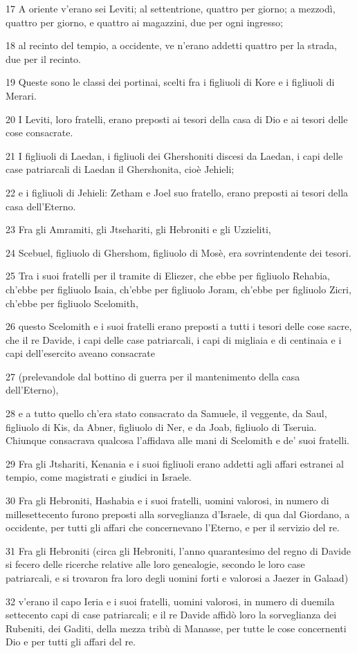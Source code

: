 \par 17 A oriente v'erano sei Leviti; al settentrione, quattro per giorno; a mezzodì, quattro per giorno, e quattro ai magazzini, due per ogni ingresso;
\par 18 al recinto del tempio, a occidente, ve n'erano addetti quattro per la strada, due per il recinto.
\par 19 Queste sono le classi dei portinai, scelti fra i figliuoli di Kore e i figliuoli di Merari.
\par 20 I Leviti, loro fratelli, erano preposti ai tesori della casa di Dio e ai tesori delle cose consacrate.
\par 21 I figliuoli di Laedan, i figliuoli dei Ghershoniti discesi da Laedan, i capi delle case patriarcali di Laedan il Ghershonita, cioè Jehieli;
\par 22 e i figliuoli di Jehieli: Zetham e Joel suo fratello, erano preposti ai tesori della casa dell'Eterno.
\par 23 Fra gli Amramiti, gli Jtsehariti, gli Hebroniti e gli Uzzieliti,
\par 24 Scebuel, figliuolo di Ghershom, figliuolo di Mosè, era sovrintendente dei tesori.
\par 25 Tra i suoi fratelli per il tramite di Eliezer, che ebbe per figliuolo Rehabia, ch'ebbe per figliuolo Isaia, ch'ebbe per figliuolo Joram, ch'ebbe per figliuolo Zicri, ch'ebbe per figliuolo Scelomith,
\par 26 questo Scelomith e i suoi fratelli erano preposti a tutti i tesori delle cose sacre, che il re Davide, i capi delle case patriarcali, i capi di migliaia e di centinaia e i capi dell'esercito aveano consacrate
\par 27 (prelevandole dal bottino di guerra per il mantenimento della casa dell'Eterno),
\par 28 e a tutto quello ch'era stato consacrato da Samuele, il veggente, da Saul, figliuolo di Kis, da Abner, figliuolo di Ner, e da Joab, figliuolo di Tseruia. Chiunque consacrava qualcosa l'affidava alle mani di Scelomith e de' suoi fratelli.
\par 29 Fra gli Jtshariti, Kenania e i suoi figliuoli erano addetti agli affari estranei al tempio, come magistrati e giudici in Israele.
\par 30 Fra gli Hebroniti, Hashabia e i suoi fratelli, uomini valorosi, in numero di millesettecento furono preposti alla sorveglianza d'Israele, di qua dal Giordano, a occidente, per tutti gli affari che concernevano l'Eterno, e per il servizio del re.
\par 31 Fra gli Hebroniti (circa gli Hebroniti, l'anno quarantesimo del regno di Davide si fecero delle ricerche relative alle loro genealogie, secondo le loro case patriarcali, e si trovaron fra loro degli uomini forti e valorosi a Jaezer in Galaad)
\par 32 v'erano il capo Ieria e i suoi fratelli, uomini valorosi, in numero di duemila settecento capi di case patriarcali; e il re Davide affidò loro la sorveglianza dei Rubeniti, dei Gaditi, della mezza tribù di Manasse, per tutte le cose concernenti Dio e per tutti gli affari del re.

